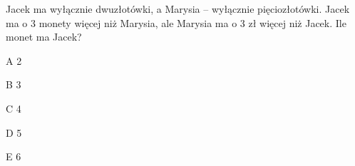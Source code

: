 \begin{tresc}
Jacek ma wyłącznie dwuzłotówki, a Marysia – wyłącznie pięciozłotówki. Jacek ma o 3 monety więcej niż Marysia, ale Marysia ma o 3 zł więcej niż Jacek. Ile monet ma Jacek?
\end{tresc}
\begin{wariant}{A} 2 \end{wariant}
\begin{wariant}{B} 3 \end{wariant}
\begin{wariant}{C} 4 \end{wariant}
\begin{wariant}{D} 5 \end{wariant}
\begin{wariant}{E} 6 \end{wariant}
